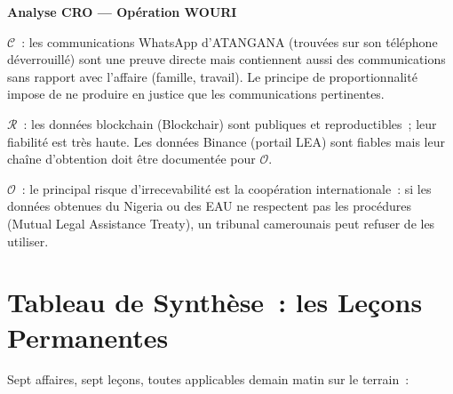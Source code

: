 \begin{boxCRO}
\textbf{Analyse CRO --- Opération WOURI}

$\mathcal{C}$~: les communications WhatsApp d'ATANGANA (trouvées sur
son téléphone déverrouillé) sont une preuve directe mais contiennent
aussi des communications sans rapport avec l'affaire (famille, travail).
Le principe de proportionnalité impose de ne produire en justice que
les communications pertinentes.

$\mathcal{R}$~: les données blockchain (Blockchair) sont publiques et
reproductibles~; leur fiabilité est très haute. Les données Binance
(portail LEA) sont fiables mais leur chaîne d'obtention doit être
documentée pour $\mathcal{O}$.

$\mathcal{O}$~: le principal risque d'irrecevabilité est la coopération
internationale~: si les données obtenues du Nigeria ou des EAU ne
respectent pas les procédures  (Mutual Legal Assistance
Treaty), un tribunal camerounais peut refuser de les utiliser.

\end{boxCRO}

\section{Tableau de Synthèse~: les Leçons Permanentes}
\label{sec:synthese-affaires}

Sept affaires, sept leçons, toutes applicables demain matin sur le terrain~:

